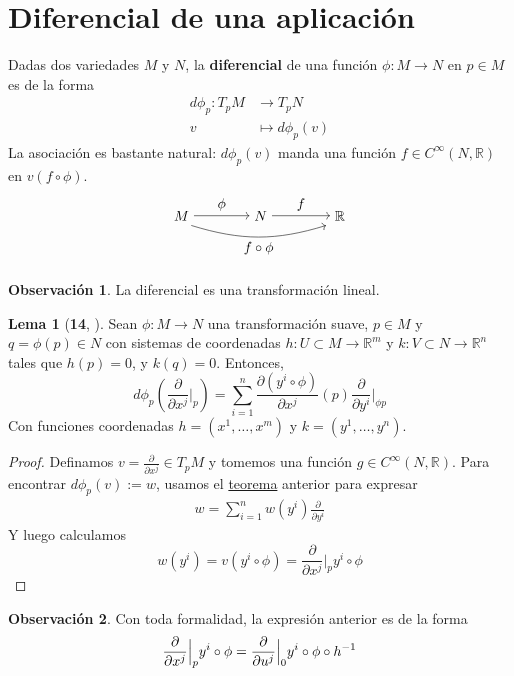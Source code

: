 \documentclass[spanish]{book}
\theoremstyle{definition}
\newtheorem*{lema}{Lema}
\newtheorem*{obs}{Observación}
\newcommand{\R}{\mathbb{R}}
\newcommand{\Cinf}{C^\infty}
\begin{document}
	\section{Diferencial de una aplicación}
	Dadas dos variedades $M$ y $N$, la \textbf{diferencial} de una función $\phi:M\to N$ en $p\in M$ es de la forma
	\begin{align*}
		d\phi_p:T_pM&\to T_pN\\
		v&\mapsto d\phi_p(v)
	\end{align*}
	La asociación es bastante natural: $d\phi_p(v)$ manda una función $f\in\Cinf(N,\R)$ en $v(f\circ\phi)$.
	\[\begin{tikzpicture}
		\node (A) at (0,0) {$M$};
		\node (B) at (2,0) {$N$};
		\node (C) at (4,0) {$\R$};
		\draw[->] (A) -- node[above] {$\phi$}(B);
		\draw[->] (B) -- node[above] {$f$} (C);
		\draw[->, bend right=17] ([xshift=7pt]A.south) to node[below] {$f\circ\phi$} ([xshift=-10pt]C.south);
	\end{tikzpicture}\]
	\begin{obs}
		La diferencial es una transformación lineal.
	\end{obs}
	\begin{lema}[\textbf{14}, \cite{ONeill}]\label{lema:dif-coord}
		Sean $\phi:M\to N$ una transformación suave, $p\in M$ y $q=\phi(p)\in N$ con sistemas de coordenadas $h:U\subset M\to\R^m$ y $k:V\subset N\to\R^n$ tales que $h(p)=0$, y $k(q)=0$. Entonces,
		\[d\phi_p\left(\frac{\partial}{\partial x^j}\Big|_p\right)=\sum_{i=1}^n\frac{\partial(y^i\circ\phi)}{\partial x^j}(p)\frac{\partial}{\partial y^i}\Big|_{\phi p}\]
		Con funciones coordenadas  $h=(x^1,\ldots,x^m)$ y $k=(y^1,\ldots,y^n)$.
	\end{lema}
	\begin{proof}
		Definamos $v=\frac{\partial}{\partial x^j}\in T_pM$ y tomemos una función $g\in\Cinf(N,\R)$. Para encontrar $d\phi_p(v):=w$, usamos el \hyperref[teo:base]{teorema} anterior para expresar
		\begin{align*}
			w=\sum_{i=1}^nw(y^i)\frac{\partial}{\partial y^i}
		\end{align*}
		Y luego calculamos
		\[w(y^i)=v(y^i\circ\phi)=\frac{\partial}{\partial x^j}\Big|_py^i\circ\phi\]
	\end{proof}
	\begin{obs}
		Con toda formalidad, la expresión anterior es de la forma
		\[\frac{\partial}{\partial x^j}\Big|_py^i\circ\phi\\
		=\frac{\partial}{\partial u^j}\Big|_0y^i\circ\phi\circ h^{-1}	\]
	\end{obs}
\end{document}
